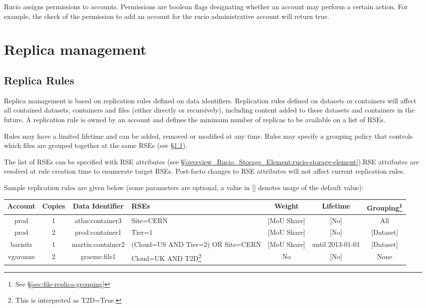 \documentclass{atlasnote}
\begin{document}
Rucio assigns permissions to accounts. Permissions are boolean flags designating whether an account may perform a certain action. For example, the check of the permission to add an account for the rucio administrative account will return true.

\section{Replica management}
\label{overview_Replica_management:replica-management}\label{overview_Replica_management::doc}

\subsection{Replica Rules}
\label{sec:replica-rules}

Replica management is based on replication rules defined on data identifiers. Replication rules defined on datasets or containers will affect all contained datasets, containers and files (either directly or recursively), including content added to these datasets and containers in the future. A replication rule is owned by an account and defines the minimum number of replicas to be available on a list of RSEs.

Rules may have a limited lifetime and can be added, removed or modified at
 any time. Rules may specify a grouping policy that controls which files
 are grouped together at the same RSEs (see \S\ref{sec:replica-rules}).

The list of RSEs can be specified with RSE attributes (see \S\ref{overview_Rucio_Storage_Element:rucio-storage-element}).RSE attributes
 are resolved at rule creation time to enumerate target RSEs. Post-facto changes
  to RSE attributes will not affect current replication rules.

Sample replication rules are given below (some parameters are optional, a value in [] denotes usage of the default value):


\begin{tabular}{c c c p{2cm} c c c}
  \textbf{Account} & \textbf{Copies} & \textbf{Data Identifier} & \textbf{RSEs} & \textbf{Weight} & \textbf{Lifetime} & \textbf{Grouping\footnote{See \S\ref{sec:file-replica-grouping} }} \\\hline
  prod & 1 & atlas:container3 & Site=CERN  & [MoU Share]  &  [No]  &  All   \\\hline
  prod  &  2 & prod:container1  & Tier=1  & [MoU Share]  & [No]   & [Dataset]  \\\hline
barisits & 1  & martin:container2  & (Cloud=US AND Tier=2) OR Site=CERN  &  [MoU Share]  &  until 2013-01-01  & [Dataset]  \\\hline
vgaronne  & 2  &  graeme:file1  & Cloud=UK AND T2D\footnote{This is interpreted as T2D=True.}  & No &  [No] & None  \\\hline
\end{tabular}
\end{document}
